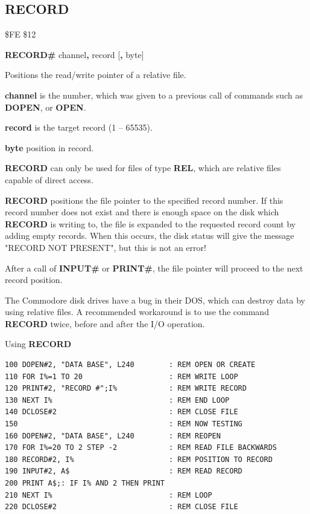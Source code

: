 
\newpage
\subsection{RECORD}
\begin{description}[leftmargin=2cm,style=nextline]
\item [Token:]    \$FE \$12

\item [Format:]   {\bf RECORD\#} channel{\bf,} record [{\bf,} byte]

\item [Usage:]    Positions the read/write pointer of a relative file.

                  {\bf channel} is the number, which was given to a previous call of commands such as {\bf DOPEN}, or {\bf OPEN}.

                  {\bf record} is the target record (1 -- 65535).

                  {\bf byte} position in record.

                  {\bf RECORD} can only be used for files of type {\bf REL}, which are relative files capable of direct access.

                  {\bf RECORD} positions the file pointer to the specified record number. If this record number does not exist and there is enough space on the disk which {\bf RECORD} is writing to, the file is expanded to the requested record count by adding empty records. When this occurs, the disk status will give the message "RECORD NOT PRESENT", but this is not an error!

                  After a call of {\bf INPUT\#} or {\bf PRINT\#}, the file pointer will proceed to the next record position.

\item [Remarks:]  The Commodore disk drives have a bug in their DOS, which can destroy data by using relative files. A recommended workaround is to use the command {\bf RECORD} twice, before and after the I/O operation.

\item [Example:] Using {\bf RECORD}

\begin{tcolorbox}[colback=black,coltext=white]
\verbatimfont{\codefont}
\begin{verbatim}
100 DOPEN#2, "DATA BASE", L240        : REM OPEN OR CREATE
110 FOR I%=1 TO 20                    : REM WRITE LOOP
120 PRINT#2, "RECORD #";I%            : REM WRITE RECORD
130 NEXT I%                           : REM END LOOP
140 DCLOSE#2                          : REM CLOSE FILE
150                                   : REM NOW TESTING
160 DOPEN#2, "DATA BASE", L240        : REM REOPEN
170 FOR I%=20 TO 2 STEP -2            : REM READ FILE BACKWARDS
180 RECORD#2, I%                      : REM POSITION TO RECORD
190 INPUT#2, A$                       : REM READ RECORD
200 PRINT A$;: IF I% AND 2 THEN PRINT
210 NEXT I%                           : REM LOOP
220 DCLOSE#2                          : REM CLOSE FILE


\end{verbatim}
\end{tcolorbox}
\end{description}
